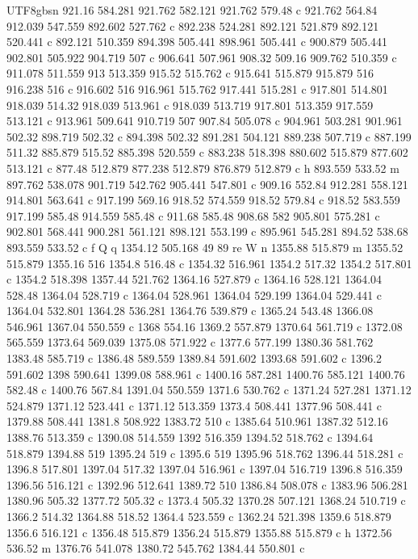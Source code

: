 \documentclass[11pt,a4paper,oneside]{report}
\begin{document}
\begin{CJK*}{UTF8}{gbsn}
{921.16 584.281 921.762 582.121 921.762 579.48 c 921.762 564.84 912.039 547.559 892.602 527.762 c 892.238
524.281 892.121 521.879 892.121 520.441 c 892.121 510.359 894.398 505.441 898.961 505.441 c 900.879
505.441 902.801 505.922 904.719 507 c 906.641 507.961 908.32 509.16 909.762 510.359 c 911.078 511.559 913
513.359 915.52 515.762 c 915.641 515.879 915.879 516 916.238 516 c 916.602 516 916.961 515.762 917.441
515.281 c 917.801 514.801 918.039 514.32 918.039 513.961 c 918.039 513.719 917.801 513.359 917.559
513.121 c 913.961 509.641 910.719 507 907.84 505.078 c 904.961 503.281 901.961 502.32 898.719 502.32 c
894.398 502.32 891.281 504.121 889.238 507.719 c 887.199 511.32 885.879 515.52 885.398 520.559 c 883.238
518.398 880.602 515.879 877.602 513.121 c 877.48 512.879 877.238 512.879 876.879 512.879 c h 893.559
533.52 m 897.762 538.078 901.719 542.762 905.441 547.801 c 909.16 552.84 912.281 558.121 914.801 563.641
c 917.199 569.16 918.52 574.559 918.52 579.84 c 918.52 583.559 917.199 585.48 914.559 585.48 c 911.68
585.48 908.68 582 905.801 575.281 c 902.801 568.441 900.281 561.121 898.121 553.199 c 895.961 545.281
894.52 538.68 893.559 533.52 c f Q q 1354.12 505.168 49 89 re W n 1355.88 515.879 m 1355.52 515.879
1355.16 516 1354.8 516.48 c 1354.32 516.961 1354.2 517.32 1354.2 517.801 c 1354.2 518.398 1357.44 521.762
1364.16 527.879 c 1364.16 528.121 1364.04 528.48 1364.04 528.719 c 1364.04 528.961 1364.04 529.199
1364.04 529.441 c 1364.04 532.801 1364.28 536.281 1364.76 539.879 c 1365.24 543.48 1366.08 546.961
1367.04 550.559 c 1368 554.16 1369.2 557.879 1370.64 561.719 c 1372.08 565.559 1373.64 569.039 1375.08
571.922 c 1377.6 577.199 1380.36 581.762 1383.48 585.719 c 1386.48 589.559 1389.84 591.602 1393.68
591.602 c 1396.2 591.602 1398 590.641 1399.08 588.961 c 1400.16 587.281 1400.76 585.121 1400.76 582.48 c
1400.76 567.84 1391.04 550.559 1371.6 530.762 c 1371.24 527.281 1371.12 524.879 1371.12 523.441 c 1371.12
513.359 1373.4 508.441 1377.96 508.441 c 1379.88 508.441 1381.8 508.922 1383.72 510 c 1385.64 510.961
1387.32 512.16 1388.76 513.359 c 1390.08 514.559 1392 516.359 1394.52 518.762 c 1394.64 518.879 1394.88
519 1395.24 519 c 1395.6 519 1395.96 518.762 1396.44 518.281 c 1396.8 517.801 1397.04 517.32 1397.04
516.961 c 1397.04 516.719 1396.8 516.359 1396.56 516.121 c 1392.96 512.641 1389.72 510 1386.84 508.078 c
1383.96 506.281 1380.96 505.32 1377.72 505.32 c 1373.4 505.32 1370.28 507.121 1368.24 510.719 c 1366.2
514.32 1364.88 518.52 1364.4 523.559 c 1362.24 521.398 1359.6 518.879 1356.6 516.121 c 1356.48 515.879
1356.24 515.879 1355.88 515.879 c h 1372.56 536.52 m 1376.76 541.078 1380.72 545.762 1384.44 550.801 c
}
\end{CJK*}
\end{document}
